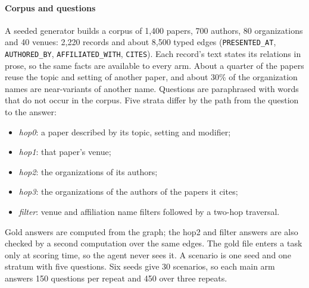 \documentclass[preprint,12pt,a4paper]{elsarticle}
\newcommand{\code}[1]{\texttt{#1}}
\begin{document}
\paragraph{Corpus and questions} A seeded generator builds a corpus of 1,400 papers, 700 authors, 80 organizations and 40 venues: 2,220 records and about 8,500 typed edges (\code{PRESENTED\_AT}, \code{AUTHORED\_BY}, \code{AFFILIATED\_WITH}, \code{CITES}). Each record's text states its relations in prose, so the same facts are available to every arm. About a quarter of the papers reuse the topic and setting of another paper, and about 30\% of the organization names are near-variants of another name. Questions are paraphrased with words that do not occur in the corpus. Five strata differ by the path from the question to the answer:
\begin{itemize}
  \item \emph{hop0}: a paper described by its topic, setting and modifier;
  \item \emph{hop1}: that paper's venue;
  \item \emph{hop2}: the organizations of its authors;
  \item \emph{hop3}: the organizations of the authors of the papers it cites;
  \item \emph{filter}: venue and affiliation name filters followed by a two-hop traversal.
\end{itemize}
Gold answers are computed from the graph; the hop2 and filter answers are also checked by a second computation over the same edges. The gold file enters a task only at scoring time, so the agent never sees it. A scenario is one seed and one stratum with five questions. Six seeds give 30 scenarios, so each main arm answers 150 questions per repeat and 450 over three repeats.
\end{document}

